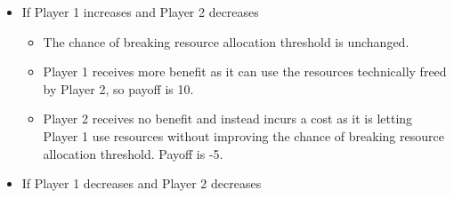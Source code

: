 \begin{itemize}
\item
If Player 1 increases and Player 2 decreases
  \begin{itemize}
  \item
    The chance of breaking resource allocation threshold is
    unchanged.
  \item
    Player 1 receives more benefit as it can use the resources
    technically freed by Player 2, so payoff is 10.
  \item
  Player 2 receives no benefit and instead incurs a cost as it is
    letting Player 1 use resources without improving the chance of
    breaking resource allocation threshold. Payoff is -5.
  \end{itemize}
\item
 If Player 1 decreases and Player 2 decreases


\end{itemize}
